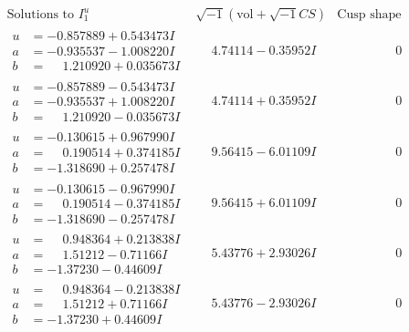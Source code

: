 \documentclass[1p]{elsarticle_modified}
\theoremstyle{definition}
\newcommand{\I}{\sqrt{-1}}
\begin{document}
$$\begin{array}{c|c|c}  
\text{Solutions to }I^u_{1}& \I (\text{vol} + \sqrt{-1}CS) & \text{Cusp shape}\\
 \hline 
\begin{aligned}
u &= -0.857889 + 0.543473 I \\
a &= -0.935537 - 1.008220 I \\
b &= \phantom{-}1.210920 + 0.035673 I\end{aligned}
 & \phantom{-}4.74114 - 0.35952 I & \phantom{-0.000000 } 0 \\ \hline\begin{aligned}
u &= -0.857889 - 0.543473 I \\
a &= -0.935537 + 1.008220 I \\
b &= \phantom{-}1.210920 - 0.035673 I\end{aligned}
 & \phantom{-}4.74114 + 0.35952 I & \phantom{-0.000000 } 0 \\ \hline\begin{aligned}
u &= -0.130615 + 0.967990 I \\
a &= \phantom{-}0.190514 + 0.374185 I \\
b &= -1.318690 + 0.257478 I\end{aligned}
 & \phantom{-}9.56415 - 6.01109 I & \phantom{-0.000000 } 0 \\ \hline\begin{aligned}
u &= -0.130615 - 0.967990 I \\
a &= \phantom{-}0.190514 - 0.374185 I \\
b &= -1.318690 - 0.257478 I\end{aligned}
 & \phantom{-}9.56415 + 6.01109 I & \phantom{-0.000000 } 0 \\ \hline\begin{aligned}
u &= \phantom{-}0.948364 + 0.213838 I \\
a &= \phantom{-}1.51212 - 0.71166 I \\
b &= -1.37230 - 0.44609 I\end{aligned}
 & \phantom{-}5.43776 + 2.93026 I & \phantom{-0.000000 } 0 \\ \hline\begin{aligned}
u &= \phantom{-}0.948364 - 0.213838 I \\
a &= \phantom{-}1.51212 + 0.71166 I \\
b &= -1.37230 + 0.44609 I\end{aligned}
 & \phantom{-}5.43776 - 2.93026 I & \phantom{-0.000000 } 0 \\ \hline\begin{aligned}

\end{aligned}
\end{array}$$
\end{document}
